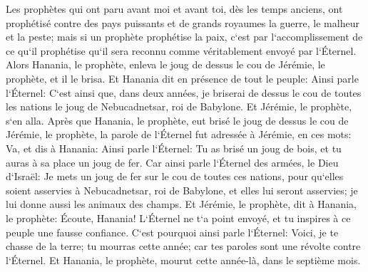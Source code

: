 \verse Les prophètes qui ont paru avant moi et avant toi, dès les temps anciens, ont prophétisé contre des pays puissants et de grands royaumes la guerre, le malheur et la peste; 
\verse mais si un prophète prophétise la paix, c`est par l`accomplissement de ce qu`il prophétise qu`il sera reconnu comme véritablement envoyé par l`Éternel. 
\verse Alors Hanania, le prophète, enleva le joug de dessus le cou de Jérémie, le prophète, et il le brisa. 
\verse Et Hanania dit en présence de tout le peuple: Ainsi parle l`Éternel: C`est ainsi que, dans deux années, je briserai de dessus le cou de toutes les nations le joug de Nebucadnetsar, roi de Babylone. Et Jérémie, le prophète, s`en alla. 
\verse Après que Hanania, le prophète, eut brisé le joug de dessus le cou de Jérémie, le prophète, la parole de l`Éternel fut adressée à Jérémie, en ces mots: 
\verse Va, et dis à Hanania: Ainsi parle l`Éternel: Tu as brisé un joug de bois, et tu auras à sa place un joug de fer. 
\verse Car ainsi parle l`Éternel des armées, le Dieu d`Israël: Je mets un joug de fer sur le cou de toutes ces nations, pour qu`elles soient asservies à Nebucadnetsar, roi de Babylone, et elles lui seront asservies; je lui donne aussi les animaux des champs. 
\verse Et Jérémie, le prophète, dit à Hanania, le prophète: Écoute, Hanania! L`Éternel ne t`a point envoyé, et tu inspires à ce peuple une fausse confiance. 
\verse C`est pourquoi ainsi parle l`Éternel: Voici, je te chasse de la terre; tu mourras cette année; car tes paroles sont une révolte contre l`Éternel. 
\verse Et Hanania, le prophète, mourut cette année-là, dans le septième mois. 

